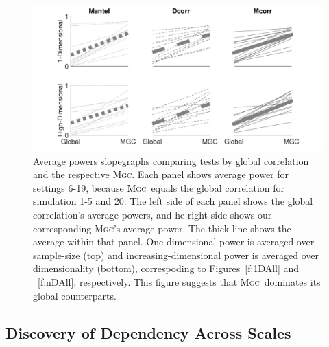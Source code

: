 \documentclass[11pt]{article}
\providecommand{\sct}[1]{{\normalfont\textsc{#1}}}
\newcommand{\Mgc}{\sct{Mgc}}
\newcommand{\Mgcp}{\sct{Mgc$_P$}}
\newcommand{\Hhg}{\sct{Hhg}}
\newcommand{\Dcorr}{\sct{Dcorr}}
\newcommand{\Mcorr}{\sct{Mcorr}}
\newcommand{\Mantel}{\sct{Mantel}}
\begin{document}
\begin{figure}
  \centering
  \includegraphics[width=1.0\textwidth]{../Figures/FigSlope}
  \caption{
Average powers slopegraphs comparing tests by global correlation and the respective \Mgc.  Each panel shows average power for settings 6-19, because \Mgc~equals the global correlation for simulation 1-5 and  20. 
The left side of each panel shows the global correlation's average powers, and 
he right side shows our corresponding \Mgc's average power. The thick line shows the average within that panel. 
One-dimensional power is averaged over sample-size (top)  and increasing-dimensional power is averaged over dimensionality (bottom), correspoding to Figures~\ref{f:1DAll} and ~\ref{f:nDAll}, respectively.
This figure suggests that \Mgc~dominates its global counterparts. 
}
\label{f:pp}
\end{figure}





\subsection*{Discovery of Dependency Across Scales}
\label{main3}
\end{document}
